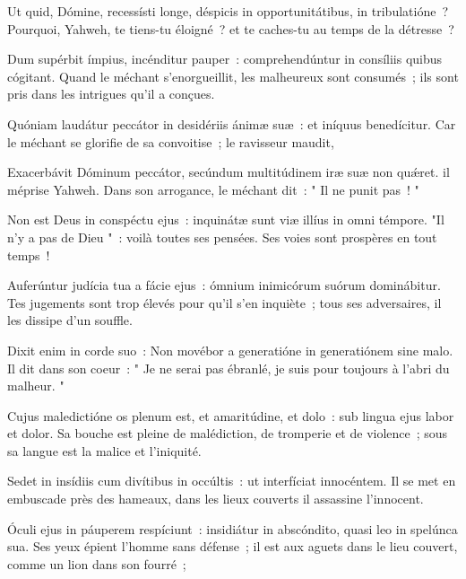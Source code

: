\begin{paracol}{2}

    \LigneParacol{0cm}
    {Ut quid, Dómine, recessísti longe, \GreStar{} déspicis in opportunitátibus, in tribulatióne~?}
    {Pourquoi, Yahweh, te tiens-tu éloigné~? et te caches-tu au temps de la détresse~? }

    \LigneParacol{0.2cm}
    {Dum supérbit ímpius, incénditur pauper~: \GreStar{} comprehendúntur in consíliis quibus cógitant.}
    {Quand le méchant s'enorgueillit, les malheureux sont consumés~; ils sont pris dans les intrigues qu'il a conçues. }

    \LigneParacol{0.2cm}
    {Quóniam laudátur peccátor in desidériis ánimæ suæ~: \GreStar{} et iníquus benedícitur.}
    {Car le méchant se glorifie de sa convoitise~; le ravisseur maudit,}

    \LigneParacol{0.2cm}
    {Exacerbávit Dóminum peccátor, \GreStar{} secúndum multitúdinem iræ suæ non quǽret.}
    {il méprise Yahweh. Dans son arrogance, le méchant dit~: " Il ne punit pas~! "}

    \LigneParacol{0.2cm}
    {Non est Deus in conspéctu ejus~: \GreStar{} inquinátæ sunt viæ illíus in omni témpore.}
    {"Il n'y a pas de Dieu "~: voilà toutes ses pensées. Ses voies sont prospères en tout temps~!}

    \LigneParacol{0.2cm}
    {Auferúntur judícia tua a fácie ejus~: \GreStar{} ómnium inimicórum suórum dominábitur.}
    {Tes jugements sont trop élevés pour qu'il s'en inquiète~; tous ses adversaires, il les dissipe d'un souffle. }

    \LigneParacol{0.2cm}
    {Dixit enim in corde suo~: \GreStar{} Non movébor a generatióne in generatiónem sine malo.}
    {Il dit dans son coeur~: " Je ne serai pas ébranlé, je suis pour toujours à l'abri du malheur. " }

    \LigneParacol{0.2cm}
    {Cujus maledictióne os plenum est, et amaritúdine, et dolo~: \GreStar{} sub lingua ejus labor et dolor.}
    {Sa bouche est pleine de malédiction, de tromperie et de violence~; sous sa langue est la malice et l'iniquité. }

    \LigneParacol{0.2cm}
    {Sedet in insídiis cum divítibus in occúltis~: \GreStar{} ut interfíciat innocéntem.}
    {Il se met en embuscade près des hameaux, dans les lieux couverts il assassine l'innocent.}

    \LigneParacol{0.2cm}
    {Óculi ejus in páuperem respíciunt~: \GreStar{} insidiátur in abscóndito, quasi leo in spelúnca sua.}
    {Ses yeux épient l'homme sans défense~; il est aux aguets dans le lieu couvert, comme un lion dans son fourré~;}


\end{paracol}
